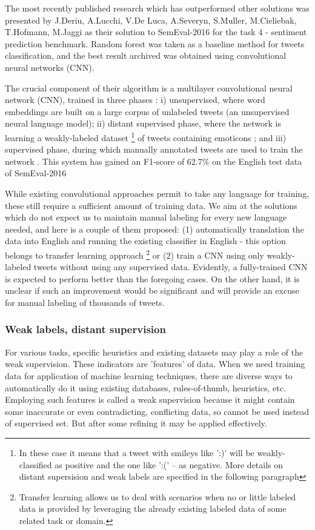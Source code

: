 \documentclass[12pt,a4paper]{article}
\begin{document}
The most recently published research which has outperformed other solutions was presented by J.Deriu, A.Lucchi, V.De Luca, A.Severyn, S.Muller, M.Cieliebak, T.Hofmann, M.Jaggi \cite{SemEval2017} as their solution to SemEval-2016 for the task 4 - sentiment prediction benchmark. Random forest was taken as a baseline method for tweets classification, and the best result archived was obtained using convolutional neural networks (CNN).

The crucial component of their algorithm is a multilayer convolutional neural network (CNN), trained in three phases \cite{SemEval2017}: i) unsupervised, where word embeddings are built on a large corpus of unlabeled tweets (an unsupervised neural language model); ii) distant supervised phase, where the network is learning a weakly-labeled dataset \footnote{In these case it means that a tweet with smileys like ':)' will be weakly-classified as positive and the one like ':(' – as negative. More details on distant supersision and weak labels are specified in the following paragraph} of tweets containing emoticons ; and iii) supervised phase, during which manually annotated tweets are used to train the network . This system has gained an F1-score of 62.7\% on the English test data of SemEval-2016 \cite{SemEval2015}

While existing convolutional approaches \cite{sent2015} permit to take any language for training, these still require a sufficient amount of training data. We aim at the solutions which do not expect us to maintain manual labeling for every new language needed, and here is a couple of them proposed: (1) automatically translation the data into English and running the existing classifier in English - this option belongs to transfer learning approach \footnote{ Transfer learning allows us to deal with scenarios when no or little labeled data is provided by leveraging the already existing labeled data of some related task or domain.} or (2) train a CNN using only weakly-labeled tweets without using any supervised data. Evidently, a fully-trained CNN is expected to perform better than the foregoing cases. On the other hand, it is unclear if such an improvement would be significant and will provide an excuse for manual labeling of thousands of tweets.

\subsubsection{Weak labels, distant supervision}
For various tasks, specific heuristics and existing datasets may play a role of the weak supervision. \cite{weakSup} These indicators are 'features' of data. When we need training data for application of machine learning techniques, there are diverse ways to automatically do it using existing databases, rules-of-thumb, heuristics, etc. Employing such features is called a weak supervision because it might contain some inaccurate or even contradicting, conflicting data, so cannot be used instead of supervised set. But after some refining it may be applied effectively.
\end{document}

